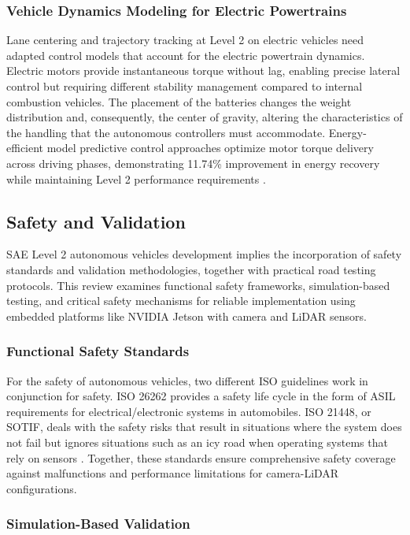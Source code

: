 \documentclass[12pt, a4paper]{report}
\begin{document}
\subsubsection{Vehicle Dynamics Modeling for Electric Powertrains}

Lane centering and trajectory tracking at Level 2 on electric vehicles need adapted control models that account for the electric powertrain dynamics. Electric motors provide instantaneous torque without lag, enabling precise lateral control but requiring different stability management compared to internal combustion vehicles. The placement of the batteries changes the weight distribution and, consequently, the center of gravity, altering the characteristics of the handling that the autonomous controllers must accommodate. Energy-efficient model predictive control approaches optimize motor torque delivery across driving phases, demonstrating 11.74\% improvement in energy recovery while maintaining Level 2 performance requirements \cite{ref26}.

\subsection{Safety and Validation}

SAE Level 2 autonomous vehicles development implies the incorporation of safety standards and validation methodologies, together with practical road testing protocols. This review examines functional safety frameworks, simulation-based testing, and critical safety mechanisms for reliable implementation using embedded platforms like NVIDIA Jetson with camera and LiDAR sensors.

\subsubsection{Functional Safety Standards}

For the safety of autonomous vehicles, two different ISO guidelines work in conjunction for safety. ISO 26262 provides a safety life cycle in the form of ASIL requirements for electrical/electronic systems in automobiles. ISO 21448, or SOTIF, deals with the safety risks that result in situations where the system does not fail but ignores situations such as an icy road when operating systems that rely on sensors \cite{ref27}. Together, these standards ensure comprehensive safety coverage against malfunctions and performance limitations for camera-LiDAR configurations.

\subsubsection{Simulation-Based Validation}
\end{document}
